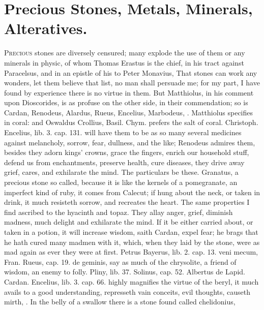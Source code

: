 {%
\section{Precious Stones, Metals, Minerals, Alteratives.}

\lettrine{P}{recious} stones are diversely censured; many explode the use of them or
any minerals in physic, of whom Thomas Erastus is the chief, in his
tract against Paracelsus, and in an epistle of his to Peter Monavius,
 That stones can work any wonders, let them believe that list, no
man shall persuade me; for my part, I have found by experience there is
no virtue in them. But Matthiolus, in his comment upon
Dioscorides, is as profuse on the other side, in their
commendation; so is Cardan, Renodeus, Alardus, Rueus, Encelius,
Marbodeus, \etc{}. Matthiolus specifies in coral: and Oswaldus
Crollius, Basil. Chym. prefers the salt of coral. Christoph.
Encelius, lib. 3. cap. 131. will have them to be as so many several
medicines against melancholy, sorrow, fear, dullness, and the like;
Renodeus admires them, besides they adorn kings' crowns, grace
the fingers, enrich our household stuff, defend us from enchantments,
preserve health, cure diseases, they drive away grief, cares, and
exhilarate the mind. The particulars be these.
Granatus, a precious stone so called, because it is like the kernels of
a pomegranate, an imperfect kind of ruby, it comes from Calecut;
if hung about the neck, or taken in drink, it much resisteth
sorrow, and recreates the heart. The same properties I find ascribed to
the hyacinth and topaz. They allay anger, grief, diminish
madness, much delight and exhilarate the mind. If it be either
carried about, or taken in a potion, it will increase wisdom, saith
Cardan, expel fear; he brags that he hath cured many madmen with it,
which, when they laid by the stone, were as mad again as ever they were
at first. Petrus Bayerus, lib. 2. cap. 13. veni mecum, Fran. Rueus,
cap. 19. de geminis, say as much of the chrysolite, a friend of
wisdom, an enemy to folly. Pliny, lib. 37. Solinus, cap. 52. Albertus
de Lapid. Cardan. Encelius, lib. 3. cap. 66. highly magnifies the
virtue of the beryl, it much avails to a good understanding,
represseth vain conceits, evil thoughts, causeth mirth, \etc{}. In the
belly of a swallow there is a stone found called chelidonius,
}
